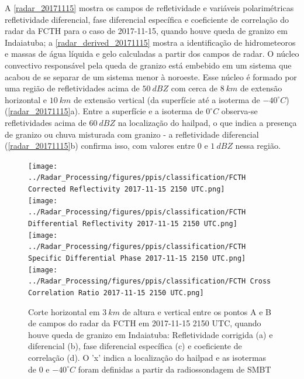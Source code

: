 A \autoref{radar_20171115} mostra os campos de refletividade e variáveis polarimétricas refletividade diferencial, fase diferencial específica e coeficiente de correlação do radar da FCTH para o caso de 2017-11-15, quando houve queda de granizo em Indaiatuba; a \autoref{radar_derived_20171115} mostra a identificação de hidrometeoros e massas de água líquida e gelo calculadas a partir dos campos de radar. O núcleo convectivo responsável pela queda de granizo está embebido em um sistema que acabou de se separar de um sistema menor à noroeste. Esse núcleo é formado por uma região de refletividades acima de $50\:dBZ$ com cerca de $8\:km$ de extensão horizontal e $10\:km$ de extensão vertical (da superfície até a isoterma de $-40^{\circ}C$) (\autoref{radar_20171115}a). Entre a superfície e a isoterma de $0^{\circ}C$ observa-se refletividades acima de $60\:dBZ$ na localização do hailpad, o que indica a presença de granizo ou chuva misturada com granizo - a refletividade diferencial (\autoref{radar_20171115}b) confirma isso, com valores entre 0 e $1\:dBZ$ nessa região.

\begin{figure}[hp]
	\centering
	\caption{Corte horizontal em $3\:km$ de altura e vertical entre os pontos A e B de campos do radar da FCTH em 2017-11-15 2150 UTC, quando houve queda de granizo em Indaiatuba: Refletividade corrigida (a) e diferencial (b), fase diferencial específica (c) e coeficiente de correlação (d). O 'x' indica a localização do hailpad e as isotermas de $0$ e $-40^{\circ}C$ foram definidas a partir da radiossondagem de SMBT}
	\label{radar_20171115}
	\vspace{-5pt}
	\texttt{[image: ../Radar\_Processing/figures/ppis/classification/FCTH Corrected Reflectivity 2017-11-15 2150 UTC.png]} \\
	\vspace{-5pt}
	\texttt{[image: ../Radar\_Processing/figures/ppis/classification/FCTH Differential Reflectivity 2017-11-15 2150 UTC.png]} \\
	\vspace{-5pt}
	\texttt{[image: ../Radar\_Processing/figures/ppis/classification/FCTH Specific Differential Phase 2017-11-15 2150 UTC.png]} \\
	\vspace{-5pt}
	\texttt{[image: ../Radar\_Processing/figures/ppis/classification/FCTH Cross Correlation Ratio 2017-11-15 2150 UTC.png]} \\
\end{figure}

